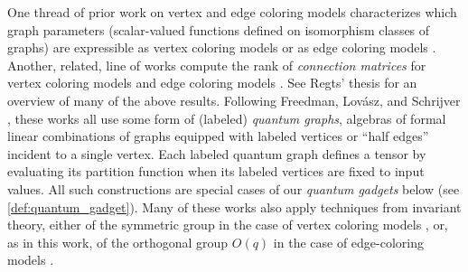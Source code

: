 \documentclass{article}
\theoremstyle{remark}
\theoremstyle{definition}
\begin{document}
One thread of prior work on vertex and edge coloring models 
characterizes which graph parameters (scalar-valued functions defined on isomorphism classes of graphs)
are expressible as vertex coloring models \cite{freedman_reflection, schrijver}
or as edge coloring models 
\cite{szegedy_edge_2007, schrijver_graph_2008, draisma_characterizing_2012, regts_characterization_2013}.
Another, related, line of works compute the rank of \emph{connection matrices}
for vertex coloring models \cite{lovasz} and edge coloring models 
\cite{regts_rank_2012,draisma_tensor_2013}.
See Regts' thesis \cite{regts} for an overview of many of the above results. 
Following Freedman, Lov\'{a}sz, and Schrijver \cite{freedman_reflection}, these works all use
some form of (labeled) \emph{quantum graphs}, algebras of formal linear combinations of graphs 
equipped with labeled vertices or ``half edges'' incident to a single vertex. Each labeled quantum
graph defines a tensor by evaluating its partition function when its labeled vertices
are fixed to input values. All such constructions are special cases of our 
\emph{quantum gadgets} below (see \autoref{def:quantum_gadget}).
Many of these works also apply techniques from invariant theory, either of the symmetric group
in the case of vertex coloring models \cite{schrijver}, or, as in this work, of the
orthogonal group $O(q)$ in the case of edge-coloring models \cite{szegedy_edge_2007, schrijver_graph_2008, draisma_characterizing_2012, regts_rank_2012, draisma_tensor_2013, regts_characterization_2013}.
\end{document}
